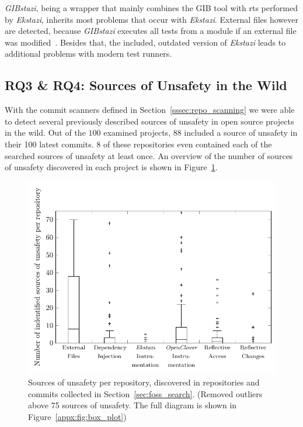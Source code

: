\emph{GIBstazi}, being a wrapper that mainly combines the GIB tool with \ac{rts} performed by \emph{Ekstazi},
inherits most problems that occur with \emph{Ekstazi}. External files however are detected, because
\emph{GIBstazi} executes all tests from a module if an external file was modified~\cite{gibstazi_paper}.
Besides that, the included, outdated version of \emph{Ekstazi} leads to additional problems with modern
test runners.

\subsection{RQ3 \& RQ4: Sources of Unsafety in the Wild}\label{ssec:eval:3_4}

With the commit scanners defined in Section~\ref{sssec:repo_scanning} we were able to detect
several previously described sources of unsafety in open source projects in the wild. Out of the $100$
examined projects, $88$ included a source of unsafety in their 100 latest commits. $8$ of these
repositories even contained each of the searched sources of unsafety at least once. An overview of
the number of sources of unsafety discovered in each project is shown in Figure~\ref{fig:box_plot}.

\begin{figure}[h]
    \caption{Sources of unsafety per repository, discovered in repositories and commits collected in
        Section~\ref{sec:foss_search}. (Removed outliers above 75 sources of unsafety. The
        full diagram is shown in Figure~\ref{appx:fig:box_plot})}\label{fig:box_plot}
    \centering
    \vspace{2em}
    \includegraphics[scale=0.9]{./figures/pdf/box_plot.pdf}
\end{figure}

